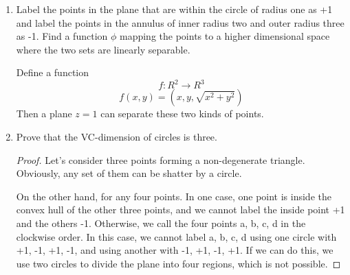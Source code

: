 \documentclass[a4paper, 12pt]{mcshw}
\begin{document}
\begin{enumerate}
    \item Label the points in the plane that are within the circle of radius one as +1 and label the points in the annulus of inner radius two and outer radius three as -1. Find a function $\phi$ mapping the points to a higher dimensional space where the two sets are linearly separable.
        \vspace{-4mm}
        \begin{solution}
            \vspace{-2mm}
            Define a function
            $$f: R^2 \rightarrow R^3$$
            $$f(x, y) = (x, y, \sqrt{x ^ 2 + y ^ 2})$$
            Then a plane $z = 1$ can separate these two kinds of points.
        \end{solution}
    \vspace{-3mm}
    \item Prove that the VC-dimension of circles is three.
    \vspace{2mm}
        \begin{proof}
            Let's consider three points forming a non-degenerate triangle. Obviously, any set of them can be shatter by a circle. 

            On the other hand, for any four points. In one case, one point is inside the convex hull of the other three points, and we cannot label the  inside point +1 and the others -1. Otherwise, we call the four points a, b, c, d in the clockwise order. In this case, we cannot label a, b, c, d using one circle with +1, -1, +1, -1, and using another with -1, +1, -1, +1. If we can do this, we use two circles to divide the plane into four regions, which is not possible.
        \end{proof}
\end{enumerate}
\end{document}
